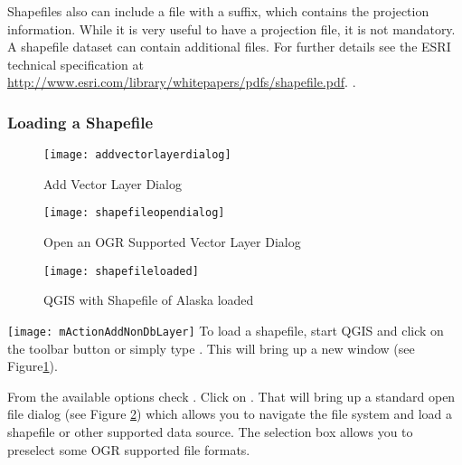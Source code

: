 Shapefiles also can include a file with a  suffix, which contains
the projection information. While it is very useful to have a projection file, it is not mandatory. A shapefile dataset can contain additional files. For further details see the ESRI technical specification at \url{http://www.esri.com/library/whitepapers/pdfs/shapefile.pdf}.
.

\subsubsection{Loading a Shapefile}\label{sec:load_shapefile}

\begin{figure}[ht]
   \begin{center}
   \caption{Add Vector Layer Dialog \nixcaption}\label{fig:addvectorlayer}\smallskip
   \texttt{[image: addvectorlayerdialog]}
\end{center} 
\end{figure}

\begin{figure}[ht]
   \begin{center}
   \caption{Open an OGR Supported Vector Layer Dialog \nixcaption}\label{fig:openshapefile}\smallskip
   \texttt{[image: shapefileopendialog]}
\end{center} 
\end{figure}

\begin{figure}[ht]
   \begin{center}
   \caption{QGIS with Shapefile of Alaska loaded \nixcaption}\label{fig:loadedshapefile}\smallskip
   \texttt{[image: shapefileloaded]}
\end{center} 
\end{figure}

\texttt{[image: mActionAddNonDbLayer]} To load a shapefile, start
QGIS and click on the 
toolbar button or simply type . 
This will bring up a new window (see Figure\ref{fig:addvectorlayer}).  

From the available options check . Click on . 
That will bring up a standard open file dialog (see Figure
\ref{fig:openshapefile}) which allows you to navigate the file system and load
a shapefile or other supported data source. 
The selection box  allows you to preselect some OGR supported file formats.

